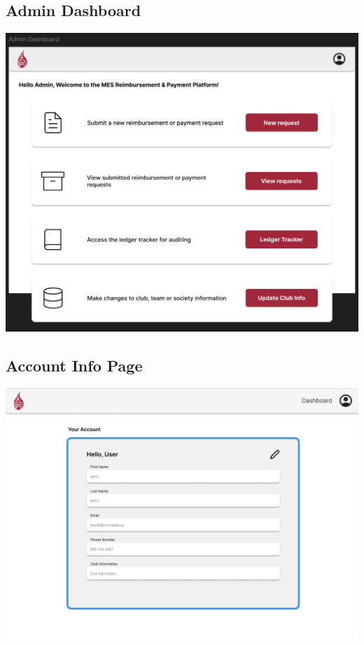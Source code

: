 \documentclass[12pt, titlepage]{article}
\begin{document}
\subsection{Admin Dashboard}
\includegraphics[]{imgs/AdminDashboard.png}

\subsection{Account Info Page}
\includegraphics[]{imgs/AccountInfoPage.png}
\end{document}
